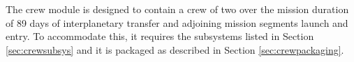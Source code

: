 The crew module is designed to contain a crew of two over the mission duration of 89 days of interplanetary transfer and adjoining mission segments launch and entry. To accommodate this, it requires the subsystems listed in Section \ref{sec:crewsubsys} and it is packaged as described in Section \ref{sec:crewpackaging}.
